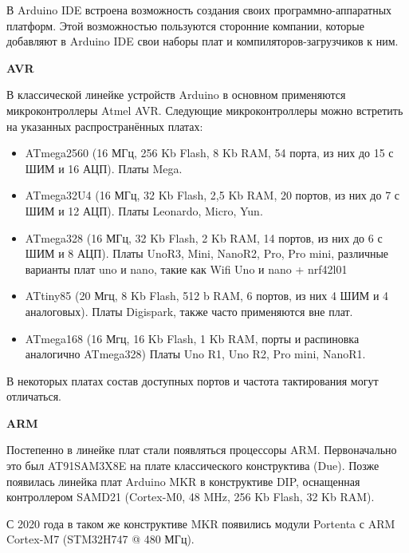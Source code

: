 \documentclass[12pt, oneside]{altsu-report}
\begin{document}
В Arduino IDE встроена возможность создания своих программно-аппаратных платформ. Этой возможностью пользуются сторонние компании, которые добавляют в Arduino IDE свои наборы плат и компиляторов-загрузчиков к ним.

\begin{center}
    \textbf{AVR}
\end{center}

В классической линейке устройств Arduino в основном применяются микроконтроллеры Atmel AVR. Следующие микроконтроллеры можно встретить на указанных распространённых платах:~\cite{Blum}

\begin{itemize}
    \item ATmega2560 (16 МГц, 256 Kb Flash, 8 Kb RAM, 54 порта, из них до 15 с ШИМ и 16 АЦП). Платы Mega.

    \item ATmega32U4 (16 МГц, 32 Kb Flash, 2,5 Kb RAM, 20 портов, из них до 7 с ШИМ и 12 АЦП). Платы Leonardo, Micro, Yun.

    \item ATmega328 (16 МГц, 32 Kb Flash, 2 Kb RAM, 14 портов, из них до 6 с ШИМ и 8 АЦП). Платы UnoR3, Mini, NanoR2, Pro, Pro mini, различные варианты плат uno и nano, такие как Wifi Uno и nano + nrf42l01

    \item ATtiny85 (20 Мгц, 8 Kb Flash, 512 b RAM, 6 портов, из них 4 ШИМ и 4 аналоговых). Платы Digispark, также часто применяются вне плат.

    \item ATmega168 (16 Мгц, 16 Kb Flash, 1 Kb RAM, порты и распиновка аналогично ATmega328) Платы Uno R1, Uno R2, Pro mini, NanoR1.
\end{itemize}

В некоторых платах состав доступных портов и частота тактирования могут отличаться.

\begin{center}
    \textbf{ARM}
\end{center}

Постепенно в линейке плат стали появляться процессоры ARM. Первоначально это был AT91SAM3X8E на плате классического конструктива (Due). Позже появилась линейка плат Arduino MKR в конструктиве DIP, оснащенная контроллером SAMD21 (Cortex-M0, 48 MHz, 256 Kb Flash, 32 Kb RAM).

С 2020 года в таком же конструктиве MKR появились модули Portenta с ARM Cortex-M7 (STM32H747 @ 480 МГц).
\end{document}
